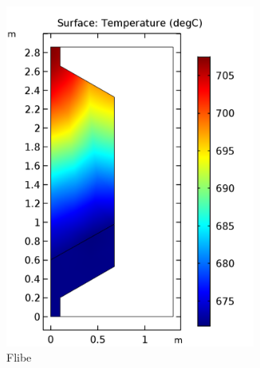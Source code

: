 \documentclass{elsarticle}
\begin{document}
 

\begin{figure}[h]
  \centering
    \begin{subfigure}[b]{0.3\textwidth}
        \centering
        \includegraphics[width=0.9\textwidth]{./images/diffusion/tmsr/SS/non_ms/T_flibe(steady_state).png}
        \caption{Flibe}
    \end{subfigure}%
    ~
    \begin{subfigure}[b]{0.3\textwidth}
        \centering

\end{subfigure}
\end{figure}
\end{document}
